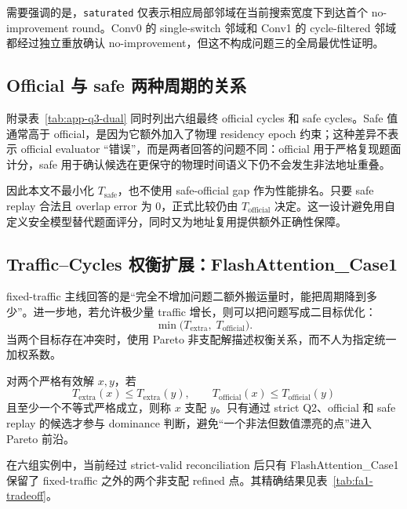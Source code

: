 需要强调的是，\texttt{saturated} 仅表示相应局部邻域在当前搜索宽度下到达首个 no-improvement round。Conv0 的 single-switch 邻域和 Conv1 的 cycle-filtered 邻域都经过独立重放确认 no-improvement，但这不构成问题三的全局最优性证明。

\subsection{Official 与 safe 两种周期的关系}

附录表~\ref{tab:app-q3-dual} 同时列出六组最终 official cycles 和 safe cycles。Safe 值通常高于 official，是因为它额外加入了物理 residency epoch 约束；这种差异不表示 official evaluator “错误”，而是两者回答的问题不同：official 用于严格复现题面计分，safe 用于确认候选在更保守的物理时间语义下仍不会发生非法地址重叠。

因此本文不最小化 $T_{\mathrm{safe}}$，也不使用 safe-official gap 作为性能排名。只要 safe replay 合法且 overlap error 为 0，正式比较仍由 $T_{\mathrm{official}}$ 决定。这一设计避免用自定义安全模型替代题面评分，同时又为地址复用提供额外正确性保障。

\subsection{Traffic--Cycles 权衡扩展：FlashAttention\_Case1}

fixed-traffic 主线回答的是“完全不增加问题二额外搬运量时，能把周期降到多少”。进一步地，若允许极少量 traffic 增长，则可以把问题写成二目标优化：
\[
\min\bigl(T_{\mathrm{extra}},\;T_{\mathrm{official}}\bigr).
\]
当两个目标存在冲突时，使用 Pareto 非支配解描述权衡关系\cite{ehrgott2005multicriteria}，而不人为指定统一加权系数。

对两个严格有效解 $x,y$，若
\[
T_{\mathrm{extra}}(x)\le T_{\mathrm{extra}}(y),\qquad
T_{\mathrm{official}}(x)\le T_{\mathrm{official}}(y)
\]
且至少一个不等式严格成立，则称 $x$ 支配 $y$。只有通过 strict Q2、official 和 safe replay 的候选才参与 dominance 判断，避免“一个非法但数值漂亮的点”进入 Pareto 前沿。

在六组实例中，当前经过 strict-valid reconciliation 后只有 FlashAttention\_Case1 保留了 fixed-traffic 之外的两个非支配 refined 点。其精确结果见表~\ref{tab:fa1-tradeoff}。

\begin{table}[H]
    \centering
    \caption{FlashAttention\_Case1 的 Traffic--Cycles refined 权衡点}
    \label{tab:fa1-tradeoff}
    \resizebox{0.86\textwidth}{!}{}
\end{table}


